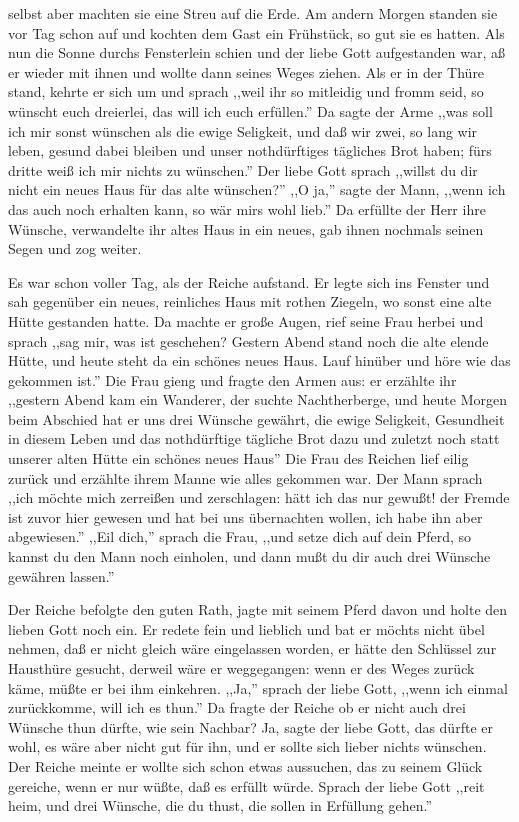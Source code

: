 \documentclass[10pt,a4paper]{article}
\begin{document}
selbst aber machten sie eine Streu auf die Erde. Am andern Morgen standen sie
vor Tag schon auf und kochten dem Gast ein Frühstück, so gut sie es hatten. Als
nun die Sonne durchs Fensterlein schien und der liebe Gott aufgestanden war, aß
er wieder mit ihnen und wollte dann seines Weges ziehen. Als er in der Thüre
stand, kehrte er sich um und sprach ,,weil ihr so mitleidig und fromm seid, so
wünscht euch dreierlei, das will ich euch erfüllen.'' Da sagte der Arme ,,was
soll ich mir sonst wünschen als die ewige Seligkeit, und daß wir zwei, so lang
wir leben, gesund dabei bleiben und unser nothdürftiges tägliches Brot haben;
fürs dritte weiß ich mir nichts zu wünschen.'' Der liebe Gott sprach ,,willst
du dir nicht ein neues Haus für das alte wünschen?'' ,,O ja,'' sagte der Mann,
,,wenn ich das auch noch erhalten kann, so wär mirs wohl lieb.'' Da erfüllte der
Herr ihre Wünsche, verwandelte ihr altes Haus in ein neues, gab ihnen nochmals
seinen Segen und zog weiter.

\vskip 4pt
Es war schon voller Tag, als der Reiche aufstand. Er legte sich ins Fenster und
sah gegenüber ein neues, reinliches Haus mit rothen Ziegeln, wo sonst eine alte
Hütte gestanden hatte. Da machte er große Augen, rief seine Frau herbei und
sprach ,,sag mir, was ist geschehen? Gestern Abend stand noch die alte elende
Hütte, und heute steht da ein schönes neues Haus. Lauf hinüber und höre wie das
gekommen ist.'' Die Frau gieng und fragte den Armen aus: er erzählte ihr
,,gestern Abend kam ein Wanderer, der suchte Nachtherberge, und heute Morgen
beim Abschied hat er uns drei Wünsche gewährt, die ewige Seligkeit, Gesundheit
in diesem Leben und das nothdürftige tägliche Brot dazu und zuletzt noch statt
unserer alten Hütte ein schönes neues Haus'' Die Frau des Reichen lief eilig
zurück und erzählte ihrem Manne wie alles gekommen war. Der Mann sprach ,,ich
möchte mich zerreißen und zerschlagen: hätt ich das nur gewußt! der Fremde ist
zuvor hier gewesen und hat bei uns übernachten wollen, ich habe ihn aber
abgewiesen.'' ,,Eil dich,'' sprach die Frau, ,,und setze dich auf dein Pferd,
so kannst du den Mann noch einholen, und dann mußt du dir auch drei Wünsche
gewähren lassen.''

\vskip 4pt
Der Reiche befolgte den guten Rath, jagte mit seinem Pferd davon und holte den
lieben Gott noch ein. Er redete fein und lieblich und bat er möchts nicht übel
nehmen, daß er nicht gleich wäre eingelassen worden, er hätte den Schlüssel zur
Hausthüre gesucht, derweil wäre er weggegangen: wenn er des Weges zurück käme,
müßte er bei ihm einkehren. ,,Ja,'' sprach der liebe Gott, ,,wenn ich einmal
zurückkomme, will ich es thun.'' Da fragte der Reiche ob er nicht auch drei
Wünsche thun dürfte, wie sein Nachbar? Ja, sagte der liebe Gott, das dürfte er
wohl, es wäre aber nicht gut für ihn, und er sollte sich lieber nichts
wünschen. Der Reiche meinte er wollte sich schon etwas aussuchen, das zu seinem
Glück gereiche, wenn er nur wüßte, daß es erfüllt würde. Sprach der liebe Gott
,,reit heim, und drei Wünsche, die du thust, die sollen in Erfüllung gehen.''
\end{document}
